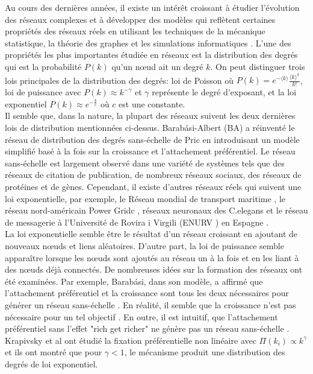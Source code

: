 Au cours des dernières années, il existe un intérêt croissant à étudier l'évolution des réseaux complexes et à développer des modèles qui reflètent certaines propriétés des réseaux réels en utilisant les techniques de la mécanique statistique, la théorie des graphes et les simulations informatiques \cite{BA1999,AB2002,Dorogovtsev-Mendes2002,Newman2003}. L'une des propriétés les plus importantes étudiée en réseaux est la distribution des degrés qui est la probabilité $P(k)$ qu'un nœud ait un degré $k$.
On peut distinguer trois lois principales de la distribution des degrés: loi de Poisson où $P(k)=e^{-\langle k\rangle}\frac{\langle k\rangle^k}{k!}$, loi de puissance avec $P(k)\approx k^{-\gamma}$ et $\gamma$ représente le degré d'exposant, et la loi exponentiel $P(k)\approx e^{-\frac{k}{c}}$ où $c$ est une constante.\\
Il semble que, dans la nature, la plupart des réseaux suivent les deux dernières lois de distribution mentionnées ci-dessus. Barab\'{a}si-Albert (BA) a réinventé le réseau de distribution des degrés sans-échelle de Pric en introduisant un modèle simplifié basé à la fois sur la croissance et l'attachement préférentiel. Le réseau sans-échelle est largement observé dans une variété de systèmes tels que des réseaux de citation de publication, de nombreux réseaux sociaux, des réseaux de protéines et de gènes. Cependant, il existe d'autres réseaux réels qui suivent une loi exponentielle, par exemple, le Réseau mondial de transport maritime \cite{ Deng-al2009}, le réseau nord-américain Power Gridc \cite{Albert-al2004}, réseaux neuronaux des C.elegans \cite{Achacoso-Yamamoto1992} et le réseau de messagerie à l'Université de Rovira i Virgili (ENURV ) en Espagne \cite{Albert-al2004}.\\
La loi exponentielle semble être le résultat d'un réseau croissant en ajoutant de nouveaux nœuds et liens aléatoires. D'autre part, la loi de puissance semble apparaître lorsque les nœuds sont ajoutés au réseau un à la fois et en les liant à des nœuds déjà connectés.
De nombreuses idées sur la formation des réseaux ont été examinées. Par exemple, Barab\'{a}si, dans son modèle, a affirmé que l'attachement préférentiel et la croissance sont tous les deux nécessaires pour générer un réseau sans-échelle \cite{BA-al1999}. En réalité, il semble que la croissance n'est pas nécessaire pour un tel objectif \cite{Xie-al2008}. En outre, il est intuitif, que l'attachement préférentiel sans l'effet "rich get richer" ne génère pas un réseau sans-échelle \cite{Samalam}. Krapivsky et al \cite{Krapivsky-al2000} ont étudié la fixation préférentielle non linéaire avec $\Pi(k_i)\varpropto k^{\gamma}$ et ils ont montré que pour $\gamma<1$, le mécanisme produit une distribution des degrés de loi exponentiel.

